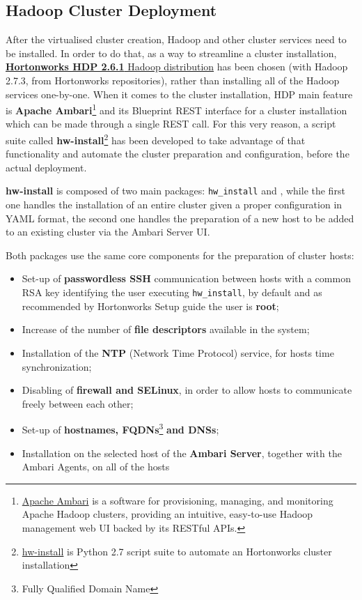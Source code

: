 \subsection{Hadoop Cluster Deployment}
After the virtualised cluster creation, Hadoop and other cluster services need to be installed. In order to do that, as a way to streamline a cluster installation, \href{https://hortonworks.com/products/data-platforms/hdp/}{\textbf{Hortonworks HDP 2.6.1} Hadoop distribution} has been chosen (with Hadoop 2.7.3, from Hortonworks repositories), rather than installing all of the Hadoop services one-by-one. When it comes to the cluster installation, HDP main feature is \textbf{Apache Ambari}\footnote{\href{https://ambari.apache.org/}{Apache Ambari} is a software for provisioning, managing, and monitoring Apache Hadoop clusters, providing an intuitive, easy-to-use Hadoop management web UI backed by its RESTful APIs.} and its Blueprint REST interface for a cluster installation which can be made through a single REST call. For this very reason, a script suite called \textbf{hw-install}\footnote{\href{https://github.com/fedexist/hw-install}{hw-install} is Python 2.7 script suite to automate an Hortonworks cluster installation} has been developed to take advantage of that functionality and automate the cluster preparation and configuration, before the actual deployment.

\textbf{hw-install} is composed of two main packages: \texttt{hw\_install} and \texttt{}, while the first one handles the installation of an entire cluster given a proper configuration in YAML format, the second one handles the preparation of a new host to be added to an existing cluster via the Ambari Server UI.

Both packages use the same core components for the preparation of cluster hosts:

\begin{itemize}
    \item Set-up of \textbf{passwordless SSH} communication between hosts with a common RSA key identifying the user executing \texttt{hw\_install}, by default and as recommended by Hortonworks Setup guide the user is \textbf{root};
    \item Increase of the number of \textbf{file descriptors} available in the system;
    \item Installation of the \textbf{NTP} (Network Time Protocol) service, for hosts time synchronization;
    \item Disabling of \textbf{firewall and SELinux}, in order to allow hosts to communicate freely between each other;
    \item Set-up of \textbf{hostnames, FQDNs}\footnote{Fully Qualified Domain Name} \textbf{and DNSs};
    \item Installation on the selected host of the \textbf{Ambari Server}, together with the Ambari Agents, on all of the hosts
\end{itemize}

